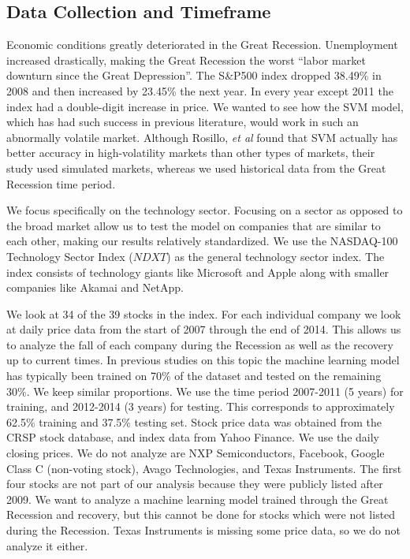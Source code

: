 \documentclass[pageno]{jpaper}
\begin{document}
\subsection{Data Collection and Timeframe}
\label{subsec: data}
Economic conditions greatly deteriorated in the Great Recession. Unemployment increased drastically, making the Great Recession the worst ``labor market downturn since the Great Depression''\cite{katz}. The S\&P500 index dropped 38.49\% in 2008 and then increased by 23.45\% the next year\cite{sp500returns}. In every year except 2011 the index had a double-digit increase in price. We wanted to see how the SVM model, which has had such success in previous literature, would work in such an abnormally volatile market. Although Rosillo, {\em et al} found that SVM actually has better accuracy in high-volatility markets than other types of markets, their study used simulated markets, whereas we used historical data from the Great Recession time period\cite{rosillo}.

We focus specifically on the technology sector. Focusing on a sector as opposed to the broad market allow us to test the model on companies that are similar to each other, making our results relatively standardized. We use the NASDAQ-100 Technology Sector Index ($NDXT$) as the general technology sector index. The index consists of technology giants like Microsoft and Apple along with smaller companies like Akamai and NetApp. 

We look at 34 of the 39 stocks in the index. For each individual company we look at daily price data from the start of 2007 through the end of 2014. This allows us to analyze the fall of each company during the Recession as well as the recovery up to current times. In previous studies on this topic the machine learning model has typically been trained on 70\% of the dataset and tested on the remaining 30\%. We keep similar proportions. We use the time period 2007-2011 (5 years) for training, and 2012-2014 (3 years) for testing. This corresponds to approximately 62.5\% training and 37.5\% testing set.
\newpage
Stock price data was obtained from the CRSP stock database, and index data from Yahoo Finance. We use the daily closing prices. We do not analyze are NXP Semiconductors, Facebook, Google Class C (non-voting stock), Avago Technologies, and Texas Instruments. The first four stocks are not part of our analysis because they were publicly listed after 2009. We want to analyze a machine learning model trained through the Great Recession and recovery, but this cannot be done for stocks which were not listed during the Recession. Texas Instruments is missing some price data, so we do not analyze it either.
\end{document}
